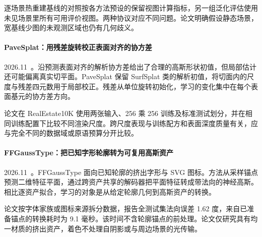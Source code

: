 逐场景热重建基线的对照按各方法预设的保留视图计算指标，另一组泛化评估使用未见场景里所有可用评价视图。两种协议对应不同问题。论文明确假设静态场景，宽基线少图的未观测区域也仍有几何歧义。

\paragraph{PaveSplat：用残差旋转校正表面对齐的协方差}
2026.11~\cite{2611_26045}。沿预测表面对齐的解析协方差给出了合理的高斯形状初值，但局部估计还可能偏离真实切平面。PaveSplat 保留 SurfSplat 类的解析初值，将切面内的尺度与残差四元数用于局部校正。残差从单位旋转初始化，学习的变化集中在每个表面基元的协方差方向。

论文在 RealEstate10K 使用两张输入、256 乘 256 训练及标准测试划分，并在相同训练配置下比较不同渲染尺度。跨尺度表现与训练配方和表面深度质量有关，应与完全不同的数据域或原语预算分开比较。

\paragraph{FFGaussType：把已知字形轮廓转为可复用高斯资产}
2026.11~\cite{2611_26431}。FFGaussType 面向已知轮廓的挤出字形与 SVG 图标。方法从采样锚点预测二维特征平面，通过跨资产共享的解码器把平面特征转成带法向的神经高斯。相比逐资产拟合，学习的对象是从给定轮廓几何到高斯资产的转换。

论文按字体家族或图标来源拆分数据，报告全测试集法向误差 1.62 度，来自已准备锚点的转换耗时为 9.1 毫秒。该时间不含轮廓锚点的前处理。论文仅研究具有均一材质的挤出资产，着色不处理自阴影或与周边场景的光传输。
